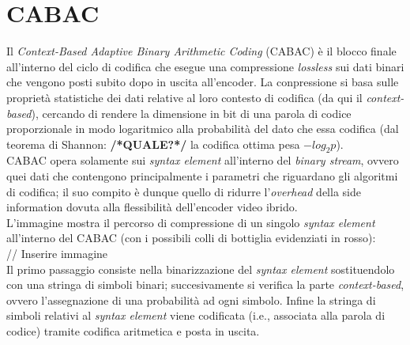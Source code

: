 
\section{CABAC}
Il \emph{Context-Based Adaptive Binary Arithmetic Coding} (CABAC) è il blocco 
finale all'interno del ciclo di codifica che esegue una compressione 
\emph{lossless} sui dati binari che vengono posti subito dopo in uscita 
all'encoder. La conpressione si basa sulle proprietà statistiche dei dati 
relative al loro contesto di codifica (da qui il \emph{context-based}), cercando
di rendere la dimensione in bit di una parola di codice proporzionale in modo 
logaritmico alla probabilità del dato che essa codifica (dal teorema di Shannon:
\textbf{/*QUALE?*/} la codifica ottima pesa $-log_2p$). \\
CABAC opera solamente sui \emph{syntax element} all'interno del \emph{binary 
stream}, ovvero quei dati che contengono principalmente i parametri che 
riguardano gli algoritmi di codifica; il suo compito è dunque quello di ridurre
l'\emph{overhead} della side information dovuta alla flessibilità dell'encoder 
video ibrido. \\
L'immagine mostra il percorso di compressione di un singolo \emph{syntax 
element} all'interno del CABAC (con i possibili colli di bottiglia evidenziati 
in rosso):
\\
// Inserire immagine
\\
Il primo passaggio consiste nella binarizzazione del \emph{syntax element} 
sostituendolo con una stringa di simboli binari; succesivamente si verifica 
la parte \emph{context-based}, ovvero l'assegnazione di una probabilità ad ogni 
simbolo. Infine la stringa di simboli relativi al \emph{syntax element} viene 
codificata (i.e., associata alla parola di codice) tramite codifica aritmetica e
posta in uscita.


